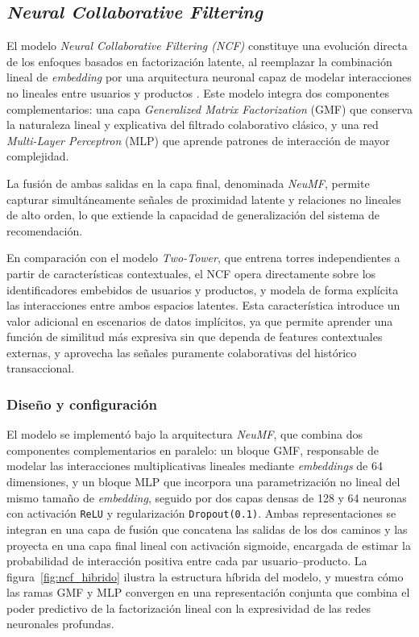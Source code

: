 \subsection{\textit{Neural Collaborative Filtering}}

El modelo \textit{Neural Collaborative Filtering (NCF)} constituye una evolución directa de los enfoques basados en factorización latente, al reemplazar la combinación lineal de \textit{embedding} por una arquitectura neuronal capaz de modelar interacciones no lineales entre usuarios y productos \cite{ARTICLE:He2017}.  
Este modelo integra dos componentes complementarios: una capa \textit{Generalized Matrix Factorization} (GMF) que conserva la naturaleza lineal y explicativa del filtrado colaborativo clásico, y una red \textit{Multi-Layer Perceptron} (MLP) que aprende patrones de interacción de mayor complejidad.  

La fusión de ambas salidas en la capa final, denominada \textit{NeuMF}, permite capturar simultáneamente señales de proximidad latente y relaciones no lineales de alto orden, lo que extiende la capacidad de generalización del sistema de recomendación.

En comparación con el modelo \textit{Two-Tower}, que entrena torres independientes a partir de características contextuales, el NCF opera directamente sobre los identificadores embebidos de usuarios y productos, y modela de forma explícita las interacciones entre ambos espacios latentes.
Esta característica introduce un valor adicional en escenarios de datos implícitos, ya que permite aprender una función de similitud más expresiva sin que dependa de features contextuales externas, y aprovecha las señales puramente colaborativas del histórico transaccional.

\subsubsection{Diseño y configuración}

El modelo se implementó bajo la arquitectura \textit{NeuMF}, que combina dos componentes complementarios en paralelo: un bloque GMF, responsable de modelar las interacciones multiplicativas lineales mediante \textit{embeddings} de 64 dimensiones, y un bloque MLP que incorpora una parametrización no lineal del mismo tamaño de \textit{embedding}, seguido por dos capas densas de 128 y 64 neuronas con activación \texttt{ReLU} y regularización \texttt{Dropout(0.1)}.  
Ambas representaciones se integran en una capa de fusión que concatena las salidas de los dos caminos y las proyecta en una capa final lineal con activación sigmoide, encargada de estimar la probabilidad de interacción positiva entre cada par usuario–producto.  
La figura~\ref{fig:ncf_hibrido} ilustra la estructura híbrida del modelo, y muestra cómo las ramas GMF y MLP convergen en una representación conjunta que combina el poder predictivo de la factorización lineal con la expresividad de las redes neuronales profundas.

